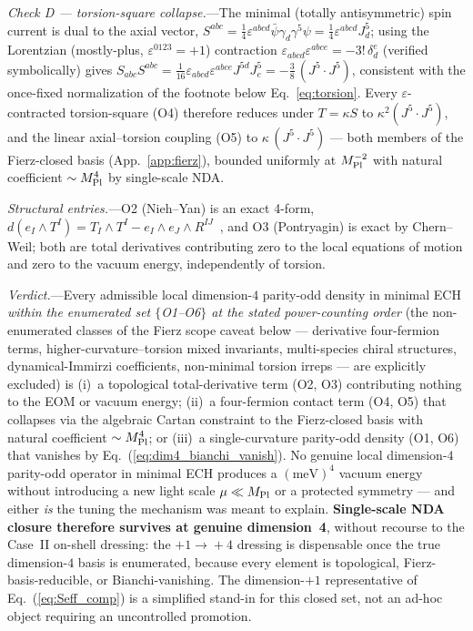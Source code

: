 \documentclass[aps,prd,twocolumn,superscriptaddress,showpacs,preprintnumbers,nofootinbib,longbibliography,floatfix]{revtex4-2}
\newcommand{\MPl}{M_{\rm Pl}}
\begin{document}
\textit{Check D --- torsion-square collapse.}---The minimal (totally
antisymmetric) spin current is dual to the axial vector,
$S^{abc}=\tfrac14\varepsilon^{abcd}\bar\psi\gamma_d\gamma^5\psi=\tfrac14\varepsilon^{abcd}J^5_d$; using
the Lorentzian (mostly-plus, $\varepsilon^{0123}=+1$) contraction
$\varepsilon_{abcd}\varepsilon^{abce}=-3!\,\delta^e_d$ (verified symbolically)
gives $S_{abc}S^{abc}=\tfrac{1}{16}\varepsilon_{abcd}\varepsilon^{abce}J^{5d}J^5_e=-\tfrac38\,(J^5\!\cdot\!J^5)$,
consistent with the once-fixed normalization of the footnote below Eq.~\eqref{eq:torsion}.
Every $\varepsilon$-contracted
torsion-square (O4) therefore reduces under $T=\kappa S$ to
$\kappa^2(J^5\!\cdot\!J^5)$, and the linear axial--torsion coupling (O5) to
$\kappa\,(J^5\!\cdot\!J^5)$ --- both members of the Fierz-closed basis
(App.~\ref{app:fierz}), bounded uniformly at $\MPl^{-2}$ with natural
coefficient $\sim\MPl^4$ by single-scale NDA.

\textit{Structural entries.}---O2 (Nieh--Yan) is an exact 4-form,
$d(e_I\wedge T^I)=T_I\wedge T^I-e_I\wedge e_J\wedge R^{IJ}$~\cite{NiehYan1982},
and O3 (Pontryagin) is exact by Chern--Weil; both are total derivatives
contributing zero to the local equations of motion and zero to the vacuum
energy, independently of torsion.

\textit{Verdict.}---Every admissible local dimension-$4$ parity-odd density in
minimal ECH \emph{within the enumerated set $\{$O1--O6$\}$ at the stated
power-counting order} (the non-enumerated classes of the Fierz scope caveat
below --- derivative four-fermion terms, higher-curvature--torsion mixed
invariants, multi-species chiral structures, dynamical-Immirzi coefficients,
non-minimal torsion irreps --- are explicitly excluded) is
(i)~a topological total-derivative term (O2, O3) contributing
nothing to the EOM or vacuum energy; (ii)~a four-fermion contact term (O4, O5)
that collapses via the algebraic Cartan constraint to the Fierz-closed basis
with natural coefficient $\sim\MPl^4$; or (iii)~a single-curvature parity-odd
density (O1, O6) that vanishes by Eq.~(\ref{eq:dim4_bianchi_vanish}). No genuine
local dimension-$4$ parity-odd operator in minimal ECH produces a
$(\text{meV})^4$ vacuum energy without introducing a new light scale
$\mu\ll\MPl$ or a protected symmetry --- and either \emph{is} the tuning the
mechanism was meant to explain. \textbf{Single-scale NDA closure therefore
survives at genuine dimension~4}, without recourse to the Case~II on-shell
dressing: the $+1\!\to\!+4$ dressing is dispensable once the true dimension-$4$
basis is enumerated, because every element is topological, Fierz-basis-reducible,
or Bianchi-vanishing. The dimension-$+1$ representative of Eq.~(\ref{eq:Seff_comp})
is a simplified stand-in for this closed set, not an ad-hoc object requiring an
uncontrolled promotion.
\end{document}
